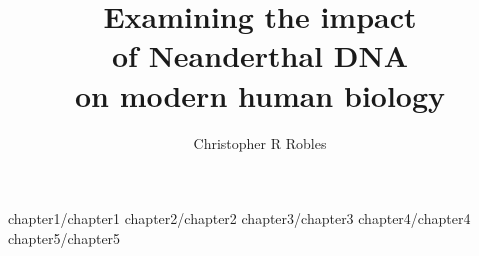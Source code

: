 \documentclass [PhD] {uclathes}
\title          {Examining the impact \\
                of Neanderthal DNA \\
                on modern human biology}
\author         {Christopher R Robles}
\begin{document}
\makeintropages

%
%
 {chapter1/chapter1}                         %
 {chapter2/chapter2}                         %
 {chapter3/chapter3}                         %
 {chapter4/chapter4}
 {chapter5/chapter5}
 \typeout{}


\end{document}
